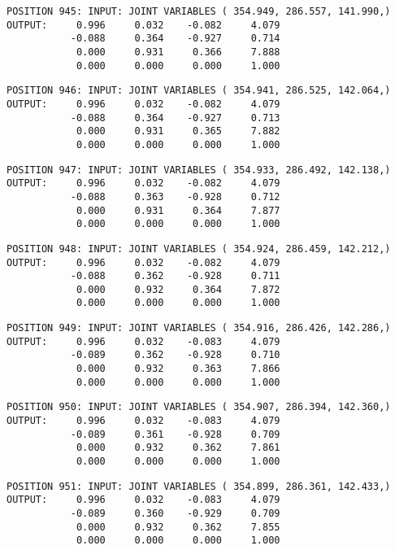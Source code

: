 \begin{verbatim}
POSITION 945: INPUT: JOINT VARIABLES ( 354.949, 286.557, 141.990,)
OUTPUT:     0.996     0.032    -0.082     4.079
           -0.088     0.364    -0.927     0.714
            0.000     0.931     0.366     7.888
            0.000     0.000     0.000     1.000
\end{verbatim} \pagebreak[1]\begin{verbatim}
POSITION 946: INPUT: JOINT VARIABLES ( 354.941, 286.525, 142.064,)
OUTPUT:     0.996     0.032    -0.082     4.079
           -0.088     0.364    -0.927     0.713
            0.000     0.931     0.365     7.882
            0.000     0.000     0.000     1.000
\end{verbatim} \pagebreak[1]\begin{verbatim}
POSITION 947: INPUT: JOINT VARIABLES ( 354.933, 286.492, 142.138,)
OUTPUT:     0.996     0.032    -0.082     4.079
           -0.088     0.363    -0.928     0.712
            0.000     0.931     0.364     7.877
            0.000     0.000     0.000     1.000
\end{verbatim} \pagebreak[1]\begin{verbatim}
POSITION 948: INPUT: JOINT VARIABLES ( 354.924, 286.459, 142.212,)
OUTPUT:     0.996     0.032    -0.082     4.079
           -0.088     0.362    -0.928     0.711
            0.000     0.932     0.364     7.872
            0.000     0.000     0.000     1.000
\end{verbatim} \pagebreak[1]\begin{verbatim}
POSITION 949: INPUT: JOINT VARIABLES ( 354.916, 286.426, 142.286,)
OUTPUT:     0.996     0.032    -0.083     4.079
           -0.089     0.362    -0.928     0.710
            0.000     0.932     0.363     7.866
            0.000     0.000     0.000     1.000
\end{verbatim} \pagebreak[1]\begin{verbatim}
POSITION 950: INPUT: JOINT VARIABLES ( 354.907, 286.394, 142.360,)
OUTPUT:     0.996     0.032    -0.083     4.079
           -0.089     0.361    -0.928     0.709
            0.000     0.932     0.362     7.861
            0.000     0.000     0.000     1.000
\end{verbatim} \pagebreak[1]\begin{verbatim}
POSITION 951: INPUT: JOINT VARIABLES ( 354.899, 286.361, 142.433,)
OUTPUT:     0.996     0.032    -0.083     4.079
           -0.089     0.360    -0.929     0.709
            0.000     0.932     0.362     7.855
            0.000     0.000     0.000     1.000
\end{verbatim} \pagebreak[1]\begin{verbatim}

\end{verbatim}
